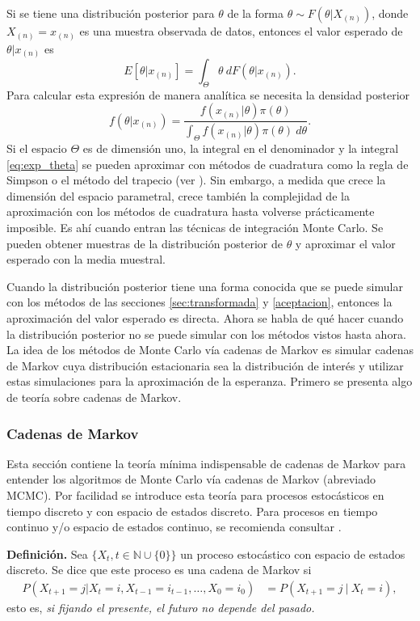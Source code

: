 \documentclass[11pt,a4paper]{article}
\begin{document}
Si se tiene una distribución posterior para $\theta$ de la forma $\theta \sim F(\theta | X_{(n)})$, donde $X_{(n)} = x_{(n)}$ es una muestra observada de datos, entonces el valor esperado de $\theta| x_{(n)}$ es
\begin{equation}
\label{eq:exp_theta}
E[\theta | x_{(n)}] = \int_{\Theta} \theta \ dF(\theta | x_{(n)}).
\end{equation}
Para calcular esta expresión de manera analítica se necesita la densidad posterior $$f(\theta | x_{(n)}) = \frac{f(x_{(n)} | \theta)\pi (\theta)}{\int_{\Theta} f(x_{(n)} | \theta)\pi (\theta) \ d\theta}.$$ Si el espacio $\Theta$ es de dimensión uno, la integral en el denominador y la integral \eqref{eq:exp_theta} se pueden aproximar con métodos de cuadratura como la regla de Simpson o el método del trapecio (ver \citet{burden}). Sin embargo, a medida que crece la dimensión del espacio parametral, crece también la complejidad de la aproximación con los métodos de cuadratura hasta volverse prácticamente imposible. Es ahí cuando entran las técnicas de integración Monte Carlo. Se pueden obtener muestras de la distribución posterior de $\theta$ y aproximar el valor esperado con la media muestral.

Cuando la distribución posterior tiene una forma conocida que se puede simular con los métodos de las secciones \ref{sec:transformada} y \ref{aceptacion}, entonces la aproximación del valor esperado es directa. Ahora se habla de qué hacer cuando la distribución posterior no se puede simular con los métodos vistos hasta ahora. La idea de los métodos de Monte Carlo vía cadenas de Markov es simular cadenas de Markov cuya distribución estacionaria sea la distribución de interés y utilizar estas simulaciones para la aproximación de la esperanza. Primero se presenta algo de teoría sobre cadenas de Markov.

\newpage

\subsubsection*{Cadenas de Markov}
Esta sección contiene la teoría mínima indispensable de cadenas de Markov para entender los algoritmos de Monte Carlo vía cadenas de Markov (abreviado MCMC). Por facilidad se introduce esta teoría para procesos estocásticos en tiempo discreto y con espacio de estados discreto. Para procesos en tiempo continuo y/o espacio de estados continuo, se recomienda consultar \citet{ross}.

\textbf{Definición.} Sea $\lbrace X_t, t \in \mathbb{N} \cup \lbrace 0 \rbrace \rbrace$ un proceso estocástico con espacio de estados discreto. Se dice que este proceso es una cadena de Markov si 
\begin{align*}
P\left( X_{t+1} = j | X_t = i, X_{t-1} = i_{t-1}, \dots, X_0 = i_0\right) &= P\left( X_{t+1} = j \ | \ X_t = i\right),
\end{align*}
esto es, \textit{si fijando el presente, el futuro no depende del pasado.}
\end{document}
